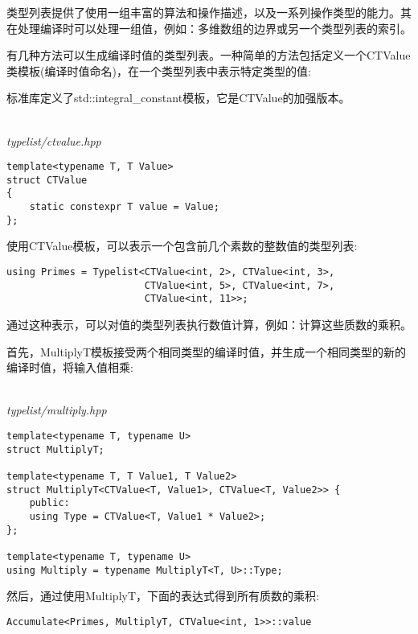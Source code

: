 
类型列表提供了使用一组丰富的算法和操作描述，以及一系列操作类型的能力。其在处理编译时可以处理一组值，例如：多维数组的边界或另一个类型列表的索引。

有几种方法可以生成编译时值的类型列表。一种简单的方法包括定义一个CTValue类模板(编译时值命名)，在一个类型列表中表示特定类型的值:

\begin{tcolorbox}[colback=webgreen!5!white,colframe=webgreen!75!black]
\hspace*{0.75cm}标准库定义了std::integral\_constant模板，它是CTValue的加强版本。
\end{tcolorbox}

\hspace*{\fill} \\ %
\noindent
\textit{typelist/ctvalue.hpp}
\begin{lstlisting}[style=styleCXX]
template<typename T, T Value>
struct CTValue
{
	static constexpr T value = Value;
};
\end{lstlisting}

使用CTValue模板，可以表示一个包含前几个素数的整数值的类型列表:

\begin{lstlisting}[style=styleCXX]
using Primes = Typelist<CTValue<int, 2>, CTValue<int, 3>,
						CTValue<int, 5>, CTValue<int, 7>,
						CTValue<int, 11>>;
\end{lstlisting}

通过这种表示，可以对值的类型列表执行数值计算，例如：计算这些质数的乘积。

首先，MultiplyT模板接受两个相同类型的编译时值，并生成一个相同类型的新的编译时值，将输入值相乘:

\hspace*{\fill} \\ %
\noindent
\textit{typelist/multiply.hpp}
\begin{lstlisting}[style=styleCXX]
template<typename T, typename U>
struct MultiplyT;

template<typename T, T Value1, T Value2>
struct MultiplyT<CTValue<T, Value1>, CTValue<T, Value2>> {
	public:
	using Type = CTValue<T, Value1 * Value2>;
};

template<typename T, typename U>
using Multiply = typename MultiplyT<T, U>::Type;
\end{lstlisting}

然后，通过使用MultiplyT，下面的表达式得到所有质数的乘积:

\begin{lstlisting}[style=styleCXX]
Accumulate<Primes, MultiplyT, CTValue<int, 1>>::value
\end{lstlisting}


